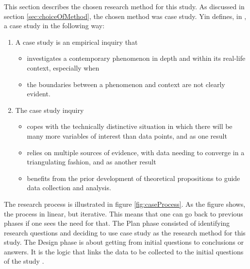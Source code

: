 This section describes the chosen research method for this study. As discussed in section \ref{sec:choiceOfMethod}, the chosen method was case study. Yin defines, in \cite{CaseStudyResearch}, a case study in the following way:

\begin{enumerate}
\item A case study is an empirical inquiry that
\begin{itemize}
\item investigates a contemporary phenomenon in depth and within its real-life context, especially when
\item the boundaries between a phenomenon and context are not clearly evident.
\end{itemize}
\item The case study inquiry
\begin{itemize}
\item copes with the technically distinctive situation in which there will be many more variables of interest than data points, and as one result
\item relies on multiple sources of evidence, with data needing to converge in a triangulating fashion, and as another result
\item benefits from the prior development of theoretical propositions to guide data collection and analysis.
\end{itemize}
\end{enumerate}

The research process is illustrated in figure \ref{fig:caseProcess}. As the figure shows, the process in linear, but iterative. This means that one can go back to previous phases if one sees the need for that. The Plan phase consisted of  identifying research questions and deciding to use case study as the research method for this study. The Design phase is about getting from initial questions to conclusions or answers. It is the logic that links the data to be collected to the initial questions of the study \cite{CaseStudyResearch}. 

